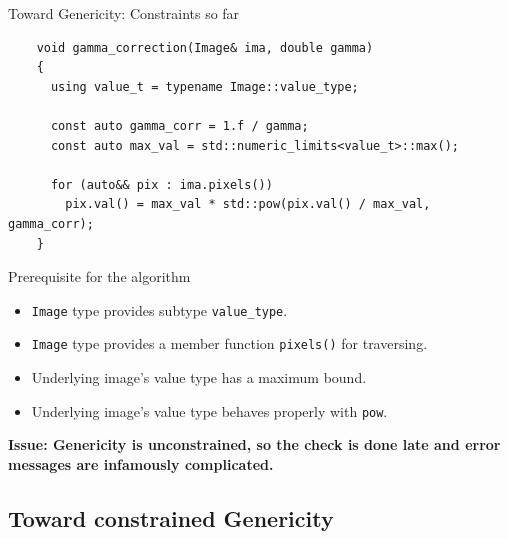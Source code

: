 \documentclass[12pt,aspectratio=169]{beamer}
\begin{document}
\begin{frame}[fragile]{Toward Genericity: Constraints so far}
  \begin{verbatim}
    void gamma_correction(Image& ima, double gamma)
    {
      using value_t = typename Image::value_type;

      const auto gamma_corr = 1.f / gamma;
      const auto max_val = std::numeric_limits<value_t>::max();
    
      for (auto&& pix : ima.pixels())
        pix.val() = max_val * std::pow(pix.val() / max_val, gamma_corr);
    }
  \end{verbatim}
  \begin{alertblock}{Prerequisite for the algorithm}
    \begin{itemize}
      \item \texttt{Image} type provides subtype \texttt{value\_type}.
      \item \texttt{Image} type provides a member function \texttt{pixels()} for traversing.
      \item Underlying image's value type has a maximum bound.
      \item Underlying image's value type behaves properly with \texttt{pow}.
    \end{itemize}
  \end{alertblock}
  \textbf{Issue: Genericity is unconstrained, so the check is done late and error messages are infamously complicated.}
  \pdfcomment[icon=Note]{   }
\end{frame}


\subsection[Toward constrained Genericity]{Toward constrained Genericity}
\end{document}
